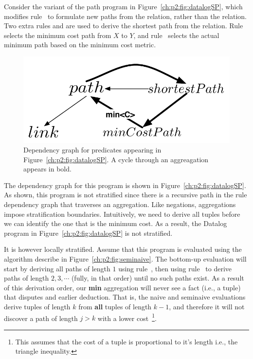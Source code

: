 Consider the variant of the path program in Figure~\ref{ch:p2:fig:datalogSP},
which modifies rule~ to formulate new paths from the  
relation, rather than the  relation.  Two extra rules  and  are used to
derive the shortest path from the  relation.  Rule~ selects the
minimum cost path from $X$ to $Y$, and rule~ selects the actual minimum
path based on the minimum cost metric.

\begin{figure} 
\ssp
\begin{center}
\includegraphics[scale=1]{figures/dependency-graph2}
\caption{\label{ch:p2:fig:dependency2}Dependency graph for predicates 
appearing in Figure~\ref{ch:p2:fig:datalogSP}. A cycle through an aggreagation
appears in bold. }
\end{center} 
\end{figure}

The dependency graph for this program is shown in
Figure~\ref{ch:p2:fig:datalogSP}.  As shown, this program is not stratified
since there is a recursive path in the rule dependency graph that traverses an
aggregation.  Like negations, aggregations impose stratification boundaries.
Intuitively, we need to derive all  tuples before we can identify the
one that is the minimum cost.  As a result, the Datalog program in
Figure~\ref{ch:p2:fig:datalogSP} is not stratified.

It is however locally stratified.  Assume that this program is evaluated using
the algorithm describe in Figure~\ref{ch:p2:fig:seminaive}.  The bottom-up
evaluation will start by deriving all paths of length $1$ using rule~,
then using rule~ to derive paths of length $2, 3, \cdots$ (fully, in
that order) until no such paths exist.  As a result of this {\emph derivation}
order, our {\bf min} aggregation will never see a fact (i.e., a 
tuple) that disputes and earlier deduction.  That is, the naive and seminaive
evaluations derive  tuples of length $k$ from {\bf all} 
tuples of length $k-1$, and therefore it will not discover a path of length $j
> k$ with a lower cost~\footnote{This assumes that the cost of a 
tuple is proportional to it's length i.e., the triangle inequality.}.

